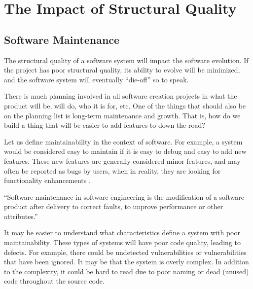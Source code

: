 \documentclass[12pt,conference]{IEEEtran}
\begin{document}
\vspace{0.5cm}
\section{The Impact of Structural Quality} \label{sectionMyIdea}
\vspace{0.25cm}

\vspace{0.25cm}
\subsection{Software Maintenance}

The structural quality of a software system will impact the software evolution. If the project has poor structural quality, its ability to evolve will be minimized, and the software system will eventually ``die-off'' so to speak.

There is much planning involved in all software creation projects in what the product will be, will do, who it is for, etc. One of the things that should also be on the planning list is long-term maintenance and growth. That is, how do we build a thing that will be easier to add features to down the road?

Let us define maintainability in the context of software. For example, a system would be considered easy to maintain if it is easy to debug and easy to add new features. These new features are generally considered minor features, and may often be reported as bugs by users, when in reality, they are looking for functionality enhancements \cite{wiki:software-maintenance}.

\vspace{0.25cm}
\begin{displayquote}
``Software maintenance in software engineering is the modification of a software product after delivery to correct faults, to improve performance or other attributes.'' \cite{wiki:software-maintenance}
\end{displayquote}
\vspace{0.25cm}

It may be easier to understand what characteristics define a system with poor maintainability. These types of systems will have poor code quality, leading to defects. For example, there could be undetected vulnerabilities or vulnerabilities that have been ignored. It may be that the system is overly complex. In addition to the complexity, it could be hard to read due to poor naming or dead (unused) code throughout the source code.
\end{document}
